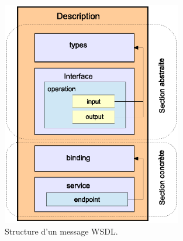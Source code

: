 \begin{figure}[h]
    \centering
    \includegraphics[width=0.7\textwidth]{figs/wsdl-document-structure.eps}
    \caption{Structure d'un message \textsc{WSDL}.}
    \label{fig:wsdl-document-structure}
\end{figure}

